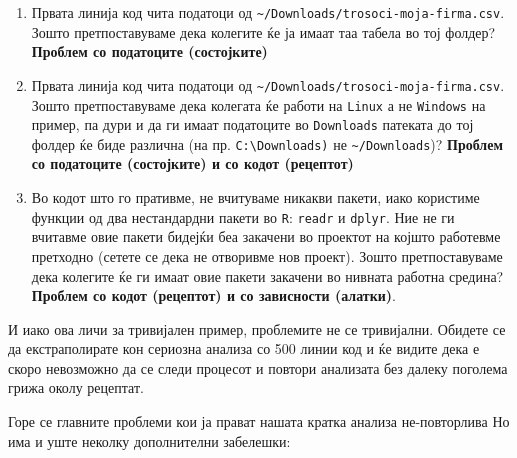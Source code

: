 \documentclass[
]{book}
\begin{document}
\begin{enumerate}
\def\labelenumi{\arabic{enumi}.}
\item
  Првата линија код чита податоци од \texttt{\textasciitilde{}/Downloads/trosoci-moja-firma.csv}. Зошто претпоставуваме дека колегите ќе ја имаат таа табела во тој фолдер? \textbf{Проблем со податоците (состојките)}
\item
  Првата линија код чита податоци од \texttt{\textasciitilde{}/Downloads/trosoci-moja-firma.csv}. Зошто претпоставуваме дека колегата ќе работи на \texttt{Linux} а не \texttt{Windows} на пример, па дури и да ги имаат податоците во \texttt{Downloads} патеката до тој фолдер ќе биде различна (на пр. \texttt{C:\textbackslash{}Downloads)} не \texttt{\textasciitilde{}/Downloads})? \textbf{Проблем со податоците (состојките) и со кодот (рецептот)}
\item
  Во кодот што го пративме, не вчитуваме никакви пакети, иако користиме функции од два нестандардни пакети во \texttt{R}: \texttt{readr} и \texttt{dplyr}. Ние не ги вчитавме овие пакети бидејќи беа закачени во проектот на којшто работевме претходно (сетете се дека не отворивме нов проект). Зошто претпоставуваме дека колегите ќе ги имаат овие пакети закачени во нивната работна средина? \textbf{Проблем со кодот (рецептот) и со зависности (алатки)}.
\end{enumerate}

И иако ова личи за тривијален пример, проблемите не се тривијални. Обидете се да екстраполирате кон сериозна анализа со 500 линии код и ќе видите дека е скоро невозможно да се следи процесот и повтори анализата без далеку поголема грижа околу рецептат.

Горе се главните проблеми кои ја прават нашата кратка анализа не-повторлива Но има и уште неколку дополнителни забелешки:
\end{document}
